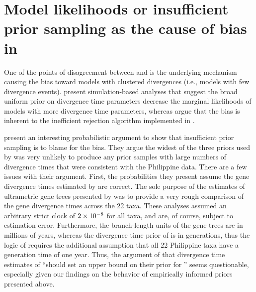 \section*{Model likelihoods or insufficient prior sampling as the cause of bias
in \msb}
One of the points of disagreement between \citet{Hickerson2013} and
\citet{Oaks2012} is the underlying mechanism causing the bias toward models
with clustered divergences (i.e., models with few divergence events).
\citet{Oaks2012} present simulation-based analyses that suggest the broad
uniform prior on divergence time parameters decrease the marginal likelihoods
of models with more divergence time parameters, whereas \citet{Hickerson2013}
argue that the bias is inherent to the inefficient rejection algorithm
implemented in \msb.

\citet{Hickerson2013} present an interesting probabilistic argument
 to show that insufficient prior sampling is to blame for the bias.
They argue the widest of the three priors used by \citet{Oaks2012} was very
unlikely to produce any prior samples with large numbers of divergence times
that were consistent with the Philippine data.
There are a few issues with their argument.
First, the probabilities they present assume the gene divergence times
estimated by \citet{Oaks2012} are correct.
The sole purpose of the estimates of ultrametric gene trees presented by
\citet{Oaks2012} was to provide a very rough comparison of the gene divergence
times across the 22 taxa.  These analyses assumed an arbitrary strict clock of
$2\times 10^{-8}$ for all taxa, and are, of course, subject to estimation error.
Furthermore, the branch-length units of the gene trees are in millions of
years, whereas the divergence time prior of \msb is in generations, thus the
logic of \citet{Hickerson2013} requires the additional assumption that all 22
Philippine taxa have a generation time of one year.
Thus, the argument of \citet{Hickerson2013} that divergence time estimates of
\citet{Oaks2012} ``should set an upper bound on their prior for \divt{}'' seems
questionable, especially given our findings on the behavior of empirically
informed priors presented above.

